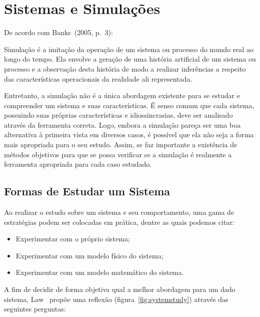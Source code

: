 \chapter{\label{chap:simulation}Sistemas e Simulações}

De acordo com Banks~(2005, p.~3):

\begin{directcite}
Simulação é a imitação da operação de um sistema ou processo do mundo real ao
longo do tempo. Ela envolve a geração de uma história artificial de um sistema
ou processo e a observação desta história de modo a realizar inferências a
respeito das características operacionais da realidade ali representada.
\end{directcite}

Entretanto, a simulação não é a única abordagem existente para se estudar e
compreender um sistema e suas características. É senso comum que cada sistema,
possuindo suas próprias características e idiossincrasias, deve ser analisado
através da ferramenta correta. Logo, embora a simulação pareça ser uma boa
alternativa à primeira vista em diversos casos, é possível que ela não seja a
forma mais apropriada para o seu estudo. Assim, se faz importante a existência
de métodos objetivos para que se possa verificar se a simulação é realmente a
ferramenta apropriada para cada caso estudado.

\section{\label{chap:waystostudy}Formas de Estudar um Sistema}

Ao realizar o estudo sobre um sistema e seu comportamento, uma gama de
estratégias podem ser colocadas em prática, dentre as quais podemos citar:

\begin{itemize}
\item Experimentar com o próprio sistema;
\item Experimentar com um modelo físico do sistema;
\item Experimentar com um modelo matemático do sistema.
\end{itemize}

A fim de decidir de forma objetiva qual a melhor abordagem para um dado sistema,
Law~\cite{Law} propõe uma reflexão (figura~\ref{fig:systemstudy}) através das
seguintes perguntas:

